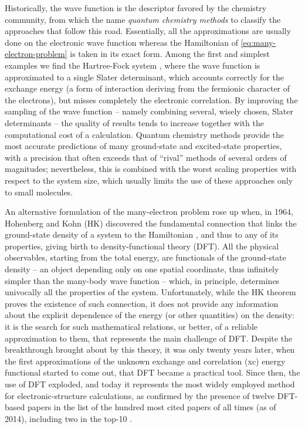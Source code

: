 Historically, the wave function is the descriptor favored by the chemistry community, from which the name \emph{quantum chemistry methods} to classify the approaches that follow this road. Essentially, all the approximations are usually done on the electronic wave function whereas the Hamiltonian of \cref{eq:many-electron-problem} is taken in its exact form. Among the first and simplest examples we find the Hartree-Fock system \cite{hartree_wave_1928,fock_naherungsmethode_1930}, where the wave function is approximated to a single Slater determinant, which accounts correctly for the exchange energy (a form of interaction deriving from the fermionic character of the electrons), but misses completely the electronic correlation. By improving the sampling of the wave function -- namely combining several, wisely chosen, Slater determinants -- the quality of results tends to increase together with the computational cost of a calculation. Quantum chemistry methods provide the most accurate predictions of many ground-state and excited-state properties, with a precision that often exceeds that of ``rival'' methods of several orders of magnitudes; nevertheless, this is combined with the worst scaling properties with respect to the system size, which usually limits the use of these approaches only to small molecules.

An alternative formulation of the many-electron problem rose up when, in 1964, Hohenberg and Kohn (HK) discovered the fundamental connection that links the ground-state density of a system to the Hamiltonian \cite{hohenberg_inhomogeneous_1964}, and thus to any of its properties, giving birth to density-functional theory (DFT). All the physical observables, starting from the total energy, are functionals of the ground-state density -- an object depending only on one spatial coordinate, thus infinitely simpler than the many-body wave function -- which, in principle, determines univocally all the properties of the system. Unfortunately, while the HK theorem proves the existence of such connection, it does not provide any information about the explicit dependence of the energy (or other quantities) on the density: it is the search for such mathematical relations, or better, of a reliable approximation to them, that represents the main challenge of DFT. Despite the breakthrough brought about by this theory, it was only twenty years later, when the first approximations of the unknown exchange and correlation (xc) energy functional started to come out, that DFT became a practical tool. Since then, the use of DFT exploded, and today it represents the most widely employed method for electronic-structure calculations, as confirmed by the presence of twelve DFT-based papers in the list of the hundred most cited papers of all times (as of 2014), including two in the top-10 \cite{van_noorden_top_2014}.

